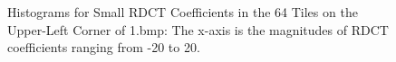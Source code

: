 \documentclass[journal,conference]{IEEEtran}
\begin{document}
\begin{figure}[h]
	\centering
	\begin{minipage}{\linewidth}
	\end{minipage}
	\begin{minipage}{\linewidth}
	\end{minipage}
	\caption{Histograms for Small RDCT Coefficients in the 64 Tiles on the Upper-Left Corner of 1.bmp: The x-axis is the magnitudes of RDCT coefficients ranging from -20 to 20.}
	\label{fig:rdct_hist}
\end{figure}
\end{document}
